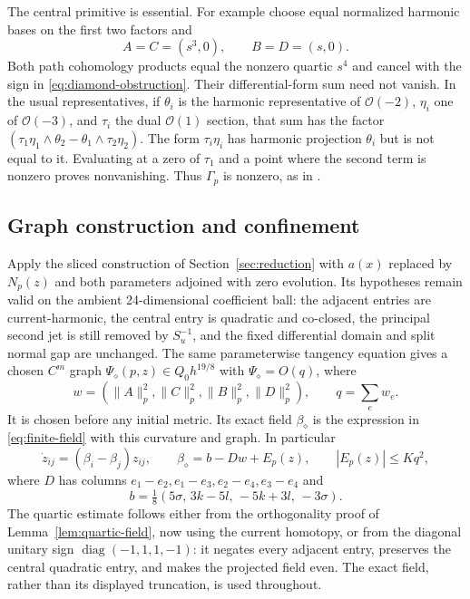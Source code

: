 \documentclass[11pt]{amsart}
\theoremstyle{definition}
\theoremstyle{remark}
\newcommand{\cO}{\mathcal O}
\newcommand{\diag}{\operatorname{diag}}
\begin{document}
The central primitive is essential. For example choose equal
normalized harmonic bases on the first two factors and
\begin{equation}\label{eq:fixed-diamond}
 A=C=(s^3,0),\qquad B=D=(s,0).
\end{equation}
Both path cohomology products equal the nonzero quartic $s^4$
and cancel with the sign in \eqref{eq:diamond-obstruction}.
Their differential-form sum need not vanish. In the usual
representatives, if $\theta_i$ is the harmonic representative of
$\cO(-2)$, $\eta_i$ one of $\cO(-3)$, and $\tau_i$ the dual
$\cO(1)$ section, that sum has the factor
$(\tau_1\eta_1\wedge\theta_2-\theta_1\wedge\tau_2\eta_2)$.
The form $\tau_i\eta_i$ has harmonic projection $\theta_i$ but
is not equal to it. Evaluating at a zero of $\tau_1$ and a point
where the second term is nonzero proves nonvanishing. Thus
$\Gamma_p$ is nonzero, as in \cite[Section 6.4]{WuebbenThreeStep26}.

\subsection{Graph construction and confinement}
Apply the sliced construction of Section~\ref{sec:reduction}
with $a(x)$ replaced by $N_p(z)$ and both parameters adjoined
with zero evolution. Its hypotheses remain valid on the ambient
24-dimensional coefficient ball: the adjacent entries are
current-harmonic, the central entry is quadratic and co-closed,
the principal second jet is still removed by $S_u^{-1}$, and
the fixed differential domain and split normal gap are unchanged.
The same parameterwise tangency equation gives a chosen
$C^m$ graph $\Psi_\diamond(p,z)\in Q_0h^{19/8}$ with
$\Psi_\diamond=O(q)$, where
\[
 w=(\|A\|_p^2,\|C\|_p^2,\|B\|_p^2,\|D\|_p^2),\qquad
 q=\sum_e w_e .
\]
It is chosen before any initial metric. Its exact field
$\beta_\diamond$ is the expression in
\eqref{eq:finite-field} with this curvature and graph. In
particular
\begin{equation}\label{eq:diamond-field}
 \dot z_{ij}=(\beta_i-\beta_j)z_{ij},\qquad
 \beta_\diamond=b-Dw+E_p(z),\qquad |E_p(z)|\le Kq^2,
\end{equation}
where $D$ has columns $e_1-e_2,e_1-e_3,e_2-e_4,e_3-e_4$ and
\begin{equation}\label{eq:diamond-demand}
 b=\tfrac18(5\sigma,\,3k-5l,\,-5k+3l,\,-3\sigma).
\end{equation}
The quartic estimate follows either from the orthogonality proof
of Lemma~\ref{lem:quartic-field}, now using the current homotopy,
or from the diagonal unitary sign
$\diag(-1,1,1,-1)$: it negates every adjacent entry, preserves
the central quadratic entry, and makes the projected field even.
The exact field, rather than its displayed truncation, is used
throughout.
\end{document}
